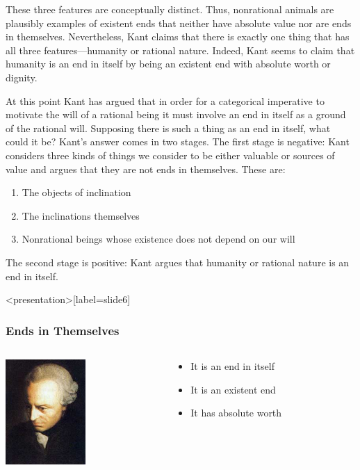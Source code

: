 These three features are conceptually distinct. Thus, nonrational animals are plausibly examples of existent ends that neither have absolute value nor are ends in themselves. Nevertheless, Kant claims that there is exactly one thing that has all three features---humanity or rational nature. Indeed, Kant seems to claim that humanity is an end in itself by being an existent end with absolute worth or dignity.

At this point Kant has argued that in order for a categorical imperative to motivate the will of a rational being it must involve an end in itself as a ground of the rational will. Supposing there is such a thing as an end in itself, what could it be? Kant’s answer comes in two stages. The first stage is negative: Kant considers three kinds of things we consider to be either valuable or sources of value and argues that they are not ends in themselves. These are:
\begin{enumerate}
    \item The objects of inclination
    \item The inclinations themselves
    \item Nonrational beings whose existence does not depend on our will
\end{enumerate}
The second stage is positive: Kant argues that humanity or rational nature is an end in itself. \change

\begin{frame}<presentation>[label=slide6]
    \frametitle{Ends in Themselves}
        \begin{columns}
            \begin{column}{3cm}
                \includegraphics[height=4cm]{../../../graphics/kant.jpg}
            \end{column}
            \begin{column}{7cm}
                \begin{itemize}
                \item<2-> It is an \alert{end in itself}
                \item<3-> It is an \alert{existent end}
                \item<4-> It has \alert{absolute worth}
                \end{itemize}
            \end{column}
        \end{columns}
\end{frame}

